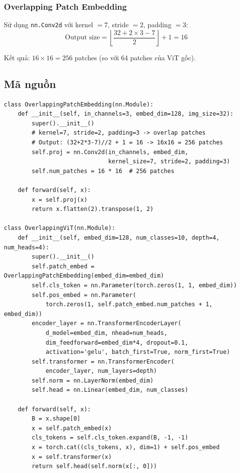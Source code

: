 \documentclass[a4paper]{article}
\newcommand{\code}[1]{\texttt{\textcolor{blue!80!black}{#1}}}
\theoremstyle{definition}
\begin{document}
\subsubsection{Overlapping Patch Embedding}
Sử dụng \code{nn.Conv2d} với kernel $= 7$, stride $= 2$, padding $= 3$:
\begin{equation}
	\text{Output size} = \left\lfloor \frac{32 + 2 \times 3 - 7}{2} \right\rfloor + 1 = 16
\end{equation}

Kết quả: $16 \times 16 = 256$ patches (so với 64 patches của ViT gốc).

\subsection{Mã nguồn}
\begin{verbatim}
class OverlappingPatchEmbedding(nn.Module):
    def __init__(self, in_channels=3, embed_dim=128, img_size=32):
        super().__init__()
        # kernel=7, stride=2, padding=3 -> overlap patches
        # Output: (32+2*3-7)//2 + 1 = 16 -> 16x16 = 256 patches
        self.proj = nn.Conv2d(in_channels, embed_dim,
                              kernel_size=7, stride=2, padding=3)
        self.num_patches = 16 * 16  # 256 patches

    def forward(self, x):
        x = self.proj(x)
        return x.flatten(2).transpose(1, 2)

class OverlappingViT(nn.Module):
    def __init__(self, embed_dim=128, num_classes=10, depth=4, num_heads=4):
        super().__init__()
        self.patch_embed = OverlappingPatchEmbedding(embed_dim=embed_dim)
        self.cls_token = nn.Parameter(torch.zeros(1, 1, embed_dim))
        self.pos_embed = nn.Parameter(
            torch.zeros(1, self.patch_embed.num_patches + 1, embed_dim))
        encoder_layer = nn.TransformerEncoderLayer(
            d_model=embed_dim, nhead=num_heads,
            dim_feedforward=embed_dim*4, dropout=0.1,
            activation='gelu', batch_first=True, norm_first=True)
        self.transformer = nn.TransformerEncoder(
            encoder_layer, num_layers=depth)
        self.norm = nn.LayerNorm(embed_dim)
        self.head = nn.Linear(embed_dim, num_classes)

    def forward(self, x):
        B = x.shape[0]
        x = self.patch_embed(x)
        cls_tokens = self.cls_token.expand(B, -1, -1)
        x = torch.cat((cls_tokens, x), dim=1) + self.pos_embed
        x = self.transformer(x)
        return self.head(self.norm(x[:, 0]))
\end{verbatim}
\end{document}
